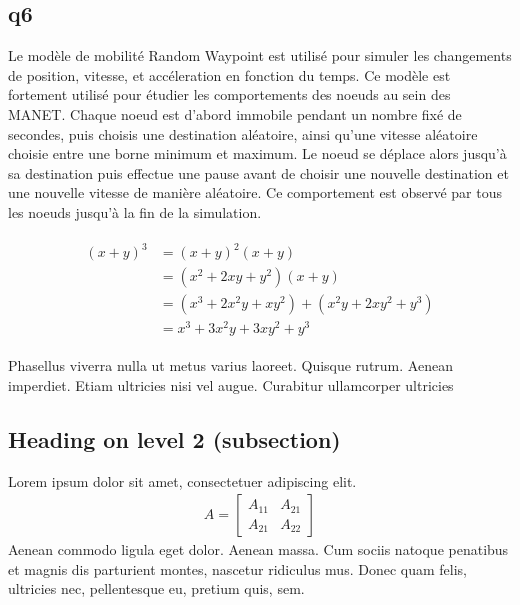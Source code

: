\documentclass[paper=a4, fontsize=11pt]{scrartcl} %
\numberwithin{equation}{section} %
\numberwithin{figure}{section} %
\numberwithin{table}{section} %
\begin{document}
\subsection{q6}

Le modèle de mobilité Random Waypoint est utilisé pour simuler les changements de position, vitesse, et accéleration en fonction du temps. Ce modèle est fortement utilisé
pour étudier les comportements des noeuds au sein des MANET. Chaque noeud est d'abord immobile pendant un nombre fixé de secondes, puis choisis une destination aléatoire, ainsi qu'une vitesse aléatoire choisie entre une borne
minimum et maximum. Le noeud se déplace alors jusqu'à sa destination puis effectue une pause avant de choisir une nouvelle destination et une nouvelle vitesse de manière aléatoire. Ce comportement est observé par tous les noeuds jusqu'à 
la fin de la simulation.

\lipsum[2] %

\begin{align} 
\begin{split}
(x+y)^3 	&= (x+y)^2(x+y)\\
&=(x^2+2xy+y^2)(x+y)\\
&=(x^3+2x^2y+xy^2) + (x^2y+2xy^2+y^3)\\
&=x^3+3x^2y+3xy^2+y^3
\end{split}					
\end{align}

Phasellus viverra nulla ut metus varius laoreet. Quisque rutrum. Aenean imperdiet. Etiam ultricies nisi vel augue. Curabitur ullamcorper ultricies


\subsection{Heading on level 2 (subsection)}

Lorem ipsum dolor sit amet, consectetuer adipiscing elit. 
\begin{align}
A = 
\begin{bmatrix}
A_{11} & A_{21} \\
A_{21} & A_{22}
\end{bmatrix}
\end{align}
Aenean commodo ligula eget dolor. Aenean massa. Cum sociis natoque penatibus et magnis dis parturient montes, nascetur ridiculus mus. Donec quam felis, ultricies nec, pellentesque eu, pretium quis, sem.

\end{document}
